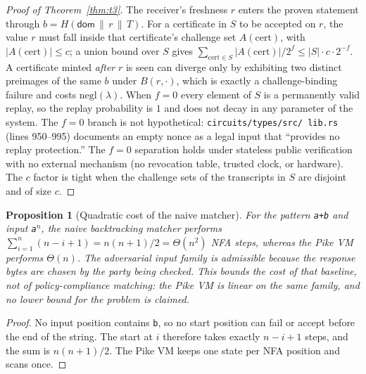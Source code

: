 \documentclass[10pt,journal,compsoc]{IEEEtran}
\newtheorem{proposition}[theorem]{Proposition}
\begin{document}
\begin{proof}[Proof of Theorem~\ref{thm:t3}]
The receiver's freshness $r$ enters the proven statement through
$b = H(\mathsf{dom} \,\|\, r \,\|\, T)$. For a certificate in $S$ to be accepted
on $r$, the value $r$ must fall inside that certificate's challenge set
$A(\mathrm{cert})$, with $|A(\mathrm{cert})|\le c$; a union bound over $S$ gives
$\sum_{\mathrm{cert}\in S}|A(\mathrm{cert})|/2^f\le |S|\cdot c\cdot 2^{-f}$.
A certificate minted \emph{after} $r$ is seen can diverge only by exhibiting two
distinct preimages of the same $b$ under $B(r,\cdot)$, which is exactly a
challenge-binding failure and costs $\mathrm{negl}(\lambda)$. When $f = 0$ every
element of $S$ is a permanently valid replay, so the replay probability is $1$
and does not decay in any parameter of the system. The $f = 0$ branch is not
hypothetical: \texttt{circuits/\allowbreak types/\allowbreak src/\allowbreak
lib.rs} (lines 950--995) documents an empty nonce as a legal input that
``provides no replay protection.'' The $f=0$ separation holds under stateless
public verification with no external mechanism (no revocation table, trusted
clock, or hardware). The $c$ factor is tight when the challenge sets of the
transcripts in $S$ are disjoint and of size $c$.
\end{proof}

\begin{proposition}[Quadratic cost of the naive matcher]
\label{prop:naive}
For the pattern \texttt{a+b} and input \texttt{a}$^n$, the naive backtracking
matcher performs
$\sum_{i=1}^{n}(n-i+1)=n(n+1)/2=\Theta(n^{2})$ NFA steps, whereas the Pike VM
performs $\Theta(n)$. The adversarial input family is admissible because the
response bytes are chosen by the party being checked. This bounds the cost of
\emph{that} baseline, not of policy-compliance matching: the Pike VM is linear
on the same family, and no lower bound for the problem is claimed.
\end{proposition}
\begin{proof}
No input position contains \texttt{b}, so no start position can fail or accept
before the end of the string. The start at $i$ therefore takes exactly
$n-i+1$ steps, and the sum is $n(n+1)/2$. The Pike VM keeps one state per NFA
position and scans once.
\end{proof}
\end{document}
